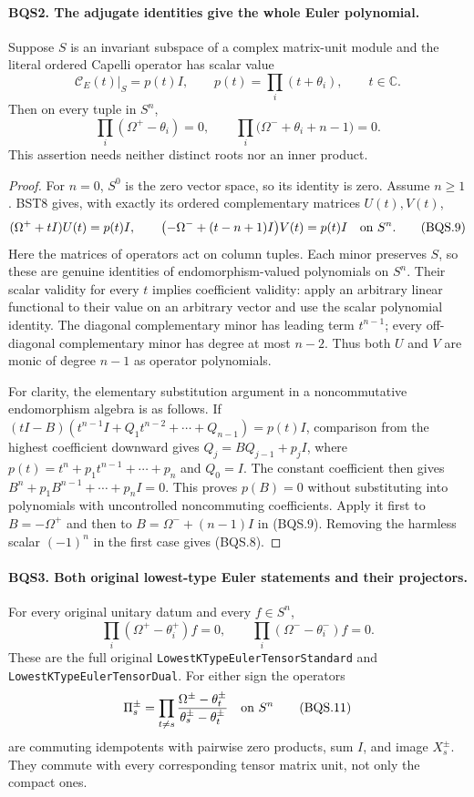 \documentclass[11pt,a4paper]{article}
\numberwithin{equation}{section}
\theoremstyle{remark}\newtheorem{remark}[theorem]{Remark}
\begin{document}
\paragraph{BQS2. The adjugate identities give the whole Euler polynomial.}
\label{claim:BQS2}
Suppose $S$ is an invariant subspace of a complex matrix-unit module and
the literal ordered Capelli operator has scalar value
\[
 \mathcal C_E(t)|_S=p(t)I,\qquad
 p(t)=\prod_i(t+\theta_i),\qquad t\in\mathbb C.
 \tag{BQS.7}
\]
Then on every tuple in $S^n$,
\[
 \prod_i(\Omega^+-\theta_i)=0,\qquad
 \prod_i\bigl(\Omega^-+\theta_i+n-1\bigr)=0.
 \tag{BQS.8}
\]
This assertion needs neither distinct roots nor an inner product.

\begin{proof}
For $n=0$, $S^0$ is the zero vector space, so its identity is zero.
Assume $n\ge1$.  BST8 gives, with exactly its ordered complementary
matrices $U(t),V(t)$,
\[
 (\Omega^++tI)U(t)=p(t)I,\qquad
 \bigl(-\Omega^-+(t-n+1)I\bigr)V(t)=p(t)I
 \quad\hbox{on }S^n.
 \tag{BQS.9}
\]
Here the matrices of operators act on column tuples.  Each minor
preserves $S$, so these are genuine identities of endomorphism-valued
polynomials on $S^n$.  Their scalar validity for every $t$ implies
coefficient validity: apply an arbitrary linear functional to their
value on an arbitrary vector and use the scalar polynomial identity.
The diagonal complementary minor has leading term $t^{n-1}$; every
off-diagonal complementary minor has degree at most $n-2$.  Thus both
$U$ and $V$ are monic of degree $n-1$ as operator polynomials.

For clarity, the elementary substitution argument in a noncommutative
endomorphism algebra is as follows.  If
$(tI-B)(t^{n-1}I+Q_1t^{n-2}+\cdots+Q_{n-1})=p(t)I$,
comparison from the highest coefficient downward gives
$Q_j=BQ_{j-1}+p_jI$, where
$p(t)=t^n+p_1t^{n-1}+\cdots+p_n$ and $Q_0=I$.
The constant coefficient then gives
$B^n+p_1B^{n-1}+\cdots+p_nI=0$.
This proves $p(B)=0$ without substituting into polynomials with
uncontrolled noncommuting coefficients.
Apply it first to $B=-\Omega^+$ and then to
$B=\Omega^-+(n-1)I$ in (BQS.9).
Removing the harmless scalar $(-1)^n$ in the first case gives (BQS.8).
\end{proof}

\paragraph{BQS3. Both original lowest-type Euler statements and their projectors.}
\label{claim:BQS3}
For every original unitary datum and every $f\in S^n$,
\[
 \prod_i(\Omega^+-\theta_i^+)f=0,\qquad
 \prod_i(\Omega^--\theta_i^-)f=0.
 \tag{BQS.10}
\]
These are the full original \texttt{LowestKTypeEuler\allowbreak{}TensorStandard}
and \texttt{LowestKTypeEuler\allowbreak{}TensorDual}.  For either sign the operators
\[
 \Pi_s^\pm=
 \prod_{t\ne s}\frac{\Omega^\pm-\theta_t^\pm}
                       {\theta_s^\pm-\theta_t^\pm}
 \quad\hbox{on }S^n
 \tag{BQS.11}
\]
are commuting idempotents with pairwise zero products, sum $I$, and
image $X_s^\pm$.  They commute with every corresponding tensor matrix
unit, not only the compact ones.
\end{document}

